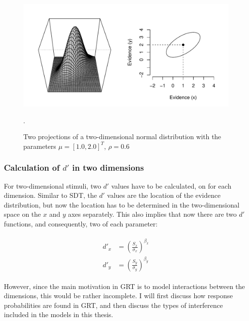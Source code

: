 \documentclass{article}\usepackage{knitr}
\begin{document}
\begin{figure}
\centering
\begin{knitrout}
\color{fgcolor}
\includegraphics[width=\maxwidth]{figure/unnamed-chunk-7-1} 

\end{knitrout}
\caption{Two projections of a two-dimensional normal distribution with the parameters $\mu = [1.0, 2.0]^T$, $\rho = 0.6$}. 
\label{fig:2dimnorm}
\end{figure}

\subsubsection{Calculation of $d'$ in two dimensions}

For two-dimensional stimuli, two $d'$ values have to be calculated, on for each dimension. Similar to SDT, the $d'$ values are the location of the evidence distribution, but now the location has to be determined in the two-dimensional space on the $x$ and $y$ axes separately. This also implies that now there are two $d'$ functions, and consequently, two of each parameter: 

\begin{align}
\label{eq:twodimdprime}
\begin{split}
d'_x &= (\frac{S_x}{\sigma_x})^{\beta_x}\\
d'_y &= (\frac{S_y}{\sigma_y})^{\beta_y}
\end{split}
\end{align}

However, since the main motivation in GRT is to model interactions between the dimensions, this would be rather incomplete. I will first discuss how response probabilities are found in GRT, and then discuss the types of interference included in the models in this thesis.
\end{document}
